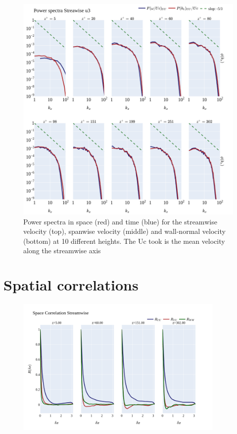 \documentclass[]{article}
\theoremstyle{plain}
\theoremstyle{remark}
\begin{document}
\begin{figure}[h!]
	\begin{center}
		\includegraphics[width=\textwidth]{../output/channel_wrles_retau395/split_time/frozen_turbulence/power_spectra/u3_all.png}
		\caption{Power spectra in space (red) and time (blue) for the streamwise velocity (top), spanwise velocity (middle) and wall-normal velocity (bottom) at 10 different heights. The Uc took is the mean velocity along the streamwise axis}
	\end{center}
\end{figure}



\section{Spatial correlations}


\begin{figure}[h!]
	\begin{center}
		\includegraphics[width=0.9\textwidth]{../output/channel_wrles_retau395/split_time/space_correlation/streamwise.png}
	\end{center}
\end{figure}
\end{document}
